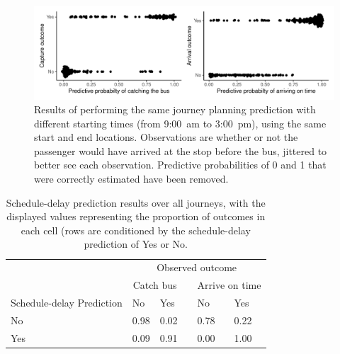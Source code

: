 \begin{knitrout}\small
{}\color{fgcolor}\begin{figure}

{\centering \includegraphics[width=\textwidth]{figure/eta_journey_results_avg-1} 

}

\caption[Results of performing the same journey planning prediction with different starting times (from  9:00~am to  3:00~pm), using the same start and end locations]{Results of performing the same journey planning prediction with different starting times (from  9:00~am to  3:00~pm), using the same start and end locations. Observations are whether or not the passenger would have arrived at the stop before the bus, jittered to better see each observation. Predictive probabilities of 0 and 1 that were correctly estimated have been removed.}\label{fig:eta_journey_results_avg}
\end{figure}

\begin{table}

\caption{\label{tab:eta_journey_results_avg}Schedule-delay prediction results over all journeys, with the displayed values representing the proportion of outcomes in each cell (rows are conditioned by the schedule-delay prediction of Yes or No. }
\centering
\fontsize{8}{10}\selectfont
\begin{tabular}[t]{llllll}
\toprule
\multicolumn{1}{c}{} & \multicolumn{5}{c}{Observed outcome} \\
\cmidrule(l{3pt}r{3pt}){2-6}
\multicolumn{1}{c}{ } & \multicolumn{2}{c}{Catch bus} & \multicolumn{1}{c}{} & \multicolumn{2}{c}{Arrive on time} \\
\cmidrule(l{3pt}r{3pt}){2-3} \cmidrule(l{3pt}r{3pt}){5-6}
Schedule-delay Prediction & No & Yes &  & No & Yes\\
\midrule
No & 0.98 & 0.02 &  & 0.78 & 0.22\\
Yes & 0.09 & 0.91 &  & 0.00 & 1.00\\
\bottomrule
\end{tabular}
\end{table}


\end{knitrout}


